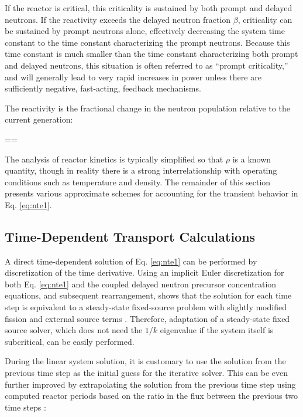 If the reactor is critical, this criticality is sustained by both prompt and delayed neutrons. If the reactivity exceeds the delayed neutron fraction \(\beta\), criticality can be sustained by prompt neutrons alone, effectively decreasing the system time constant to the time constant characterizing the prompt neutrons. Because this time constant is much smaller than the time constant characterizing both prompt and delayed neutrons, this situation is often referred to as ``prompt criticality,'' and will generally lead to very rapid increases in power unless there are sufficiently negative, fast-acting, feedback mechanisms. 

The reactivity is the fractional change in the neutron population relative to the current generation:

\beq
\label{eq:ReactivityDef}
\rho==
\eeq

The analysis of reactor kinetics is typically simplified so that \(\rho\) is a known quantity, though in reality there is a strong interrelationship with operating conditions such as temperature and density. The remainder of this section presents various approximate schemes for accounting for the transient behavior in Eq. \eqref{eq:nte1}.

\subsection{Time-Dependent Transport Calculations}
\label{sec:TimeDependence}

A direct time-dependent solution of Eq. \eqref{eq:nte1} can be performed by discretization of the time derivative. Using an implicit Euler discretization for both Eq. \eqref{eq:nte1} and the coupled delayed neutron precursor concentration equations, and subsequent rearrangement, shows that the solution for each time step is equivalent to a steady-state fixed-source problem with slightly modified fission and external source terms \cite{pautz}. Therefore, adaptation of a steady-state fixed source solver, which does not need the \(1/k\) eigenvalue if the system itself is subcritical, can be easily performed.


During the linear system solution, it is customary to use the solution from the previous time step as the initial guess for the iterative solver. This can be even further improved by extrapolating the solution from the previous time step using computed reactor periods based on the ratio in the flux between the previous two time steps \cite{pautz}:

